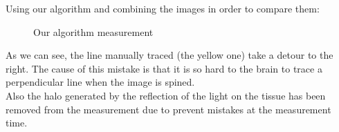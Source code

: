 Using our algorithm and combining the images in order to compare them:

    \begin{figure}[H]
      \caption{Our algorithm measurement}
      \centering \setlength\fboxsep{0pt} \setlength\fboxrule{0.5pt}
    \end{figure}

As we can see, the line manually traced (the yellow one) take a detour
to the right. The cause of this mistake is that it is so hard to the brain
to trace a perpendicular line when the image is spined. \\
Also the halo generated by the reflection of the light on the tissue
has been removed from the measurement due to prevent mistakes at the 
measurement time.
